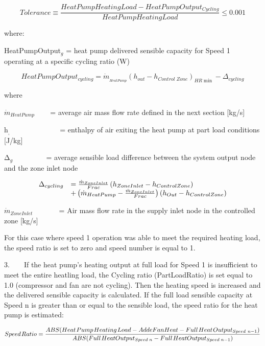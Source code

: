 \begin{equation}
  Tolerance \equiv \frac{HeatPumpHeatingLoad - HeatPumpOutput_{Cycling}}{HeatPumpHeatingLoad} \leq 0.001
\end{equation}

where:

HeatPumpOutput\(_{g}\) = heat pump delivered sensible capacity for Speed 1 operating at a specific cycling ratio (W)

\begin{equation}
HeatPumpOutpu{t_{cycling}} = {\dot m_{_{HeatPump}}}{\left( {{h_{out}} - {h_{Control\;Zone}}} \right)_{HR\min }} - {\Delta_{cycling}}
\end{equation}

where

\({\dot m_{HeatPump}}\) ~~~ = average air mass flow rate defined in the next section {[}kg/s{]}

h\(_{,}\) ~~~~~~~~~~~ ~ = enthalpy of air exiting the heat pump at part load conditions {[}J/kg{]}

Δ\(_{g}\) ~~~~~~~~ = average sensible load difference between the system output node and the zone inlet node

\begin{equation}
  \begin{array}{rl}
    \Delta_{cycling} &= \frac{\dot{m}_{ZoneInlet}}{Frac} \PB{h_{ZoneInlet} - h_{ControlZone}} \\
                           &+ \PB{\dot{m}_{HeatPump} - \frac{\dot{m}_{ZoneInlet}}{Frac}} \PB{h_{Out} - h_{ControlZone}}
  \end{array}
\end{equation}

\({{{\dot m}_{ZoneInlet}}}\) ~~~~~~ = Air mass flow rate in the supply inlet node in the controlled zone {[}kg/s{]}

For this case where speed 1 operation was able to meet the required heating load, the speed ratio is set to zero and speed number is equal to 1.

3.~~~~If the heat pump's heating output at full load for Speed 1 is insufficient to meet the entire heatling load, the Cycling ratio (PartLoadRatio) is set equal to 1.0 (compressor and fan are not cycling). Then the heating speed is increased and the delivered sensible capacity is calculated. If the full load sensible capacity at Speed n is greater than or equal to the sensible load, the speed ratio for the heat pump is estimated:

\begin{equation}
Speed{\kern 1pt} Ratio = \frac{{ABS(Heat{\kern 1pt} Pump{\kern 1pt} Heating{\kern 1pt} Load - AddeFanHeat - Full{\kern 1pt} Heat{\kern 1pt} Outpu{t_{Speed{\kern 1pt} \;n - 1}})}}{{ABS(Full{\kern 1pt} HeatOutpu{t_{Speed\;n}} - Full{\kern 1pt} HeatOutpu{t_{Speed\;n - 1}})}}
\end{equation}


